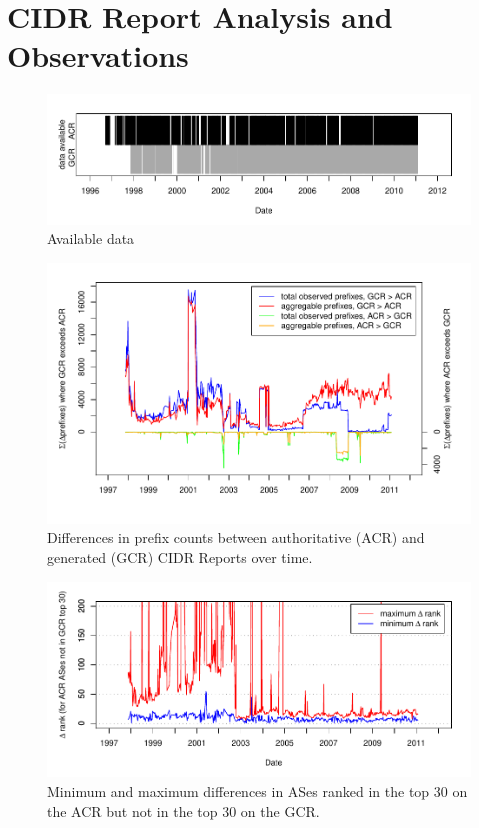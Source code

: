 \chapter{CIDR Report Analysis and Observations}

\begin{figure}
    \includegraphics[width=6in]{figures/data_avail.pdf}
    \caption{Available data}
\end{figure}

\begin{figure}
\includegraphics[width=6in]{figures/cidr_report_validity_prefix_error.pdf}
    \caption{Differences in prefix counts between authoritative (ACR) and generated (GCR) CIDR Reports over time.}
\end{figure}

\begin{figure}
    \includegraphics[width=6in]{figures/cidr_report_validity_rank_error.pdf}
    \caption{Minimum and maximum differences in ASes ranked in the top 30 on the ACR but not in the top 30 on the GCR.}
\end{figure}

